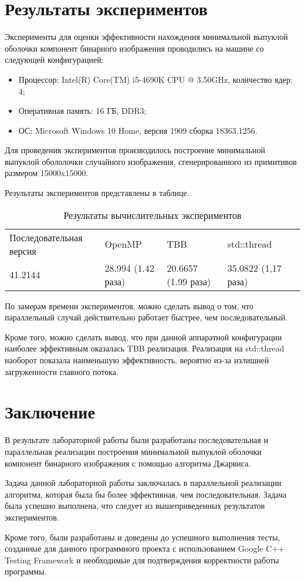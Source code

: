 \documentclass{report}
\begin{document}
\section*{Результаты экспериментов}
Эксперименты для оценки эффективности нахождения минимальной выпуклой оболочки компонент бинарного изображения проводились на машине со следующей конфигурацией:

\begin{itemize}
\item Процессор: Intel(R) Core(TM) i5-4690K CPU @ 3.50GHz, количество ядер: 4;
\item Оперативная память: 16 ГБ, DDR3;
\item ОС: Microsoft Windows 10 Home, версия 1909 сборка 18363.1256.
\end{itemize}

\par Для проведения экспериментов производилось построение минимальной выпуклой обололочки случайного изображения, сгенерированного из примитивов размером 15000x15000. 
\par Результаты экспериментов представлены в таблице.

\begin{table}[!h]
\caption{Результаты вычислительных экспериментов}
\centering
\begin{tabular}{lllll}
Последовательная версия & OpenMP & TBB & std::thread  \\
41.2144                 & 28.994 (1.42 раза) & 20.6657 (1.99 раза) & 35.0822 (1,17 раза)
\end{tabular}
\end{table}

\par По замерам времени экспериментов, можно сделать вывод о том, что параллельный случай действительно работает быстрее, чем последовательный. 
\par Кроме того, можно сделать вывод, что при данной аппаратной конфигурации наиболее эффективным оказалась TBB реализация. Реализация на std::thread наоборот показала наименьшую эффективность, вероятно из-за излишней загруженности главного потока.
\newpage

\section*{Заключение}
В результате лабораторной работы были разработаны последовательная и параллельная реализации построения минимальной выпуклой оболочки компонент бинарного изображения с помощью алгоритма Джарвиса.
\par Задача данной лабораторной работы заключалась в параллельной реализации алгоритма, которая была бы более эффективная, чем последовательная. Задача была успешно выполнена, что следует из вышеприведенных результатов экспериментов.
\par Кроме того, были разработаны и доведены до успешного выполнения тесты, созданные для данного программного проекта с использованием Google C++ Testing Framework и необходимые для подтверждения корректности работы программы.
\newpage
\end{document}

